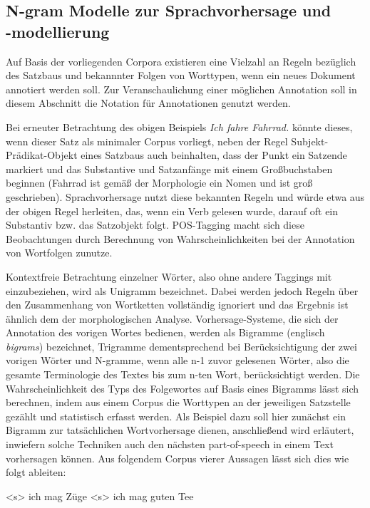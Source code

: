 \documentclass[12pt]{report}
\begin{document}
\subsection{N-gram Modelle zur Sprachvorhersage und\\ -modellierung}
Auf Basis der vorliegenden Corpora existieren eine Vielzahl an Regeln bezüglich des Satzbaus und bekannnter Folgen von Worttypen, wenn ein neues Dokument annotiert werden soll. Zur Veranschaulichung einer möglichen Annotation soll in diesem Abschnitt die Notation \cite{clw7} für Annotationen genutzt werden.

Bei erneuter Betrachtung des obigen Beispiels \textit{\glqq  Ich fahre Fahrrad.\grqq{}} könnte dieses, wenn dieser Satz als minimaler Corpus vorliegt, neben der Regel Subjekt-Prädikat-Objekt eines Satzbaus auch beinhalten, dass der Punkt ein Satzende markiert und das Substantive und Satzanfänge mit einem Großbuchstaben beginnen (\glqq  Fahrrad\grqq{} ist gemäß der Morphologie ein Nomen und ist groß geschrieben). Sprachvorhersage nutzt diese bekannten Regeln und würde etwa aus der obigen Regel herleiten, das, wenn ein Verb gelesen wurde, darauf oft ein Substantiv bzw. das Satzobjekt folgt. POS-Tagging macht sich diese Beobachtungen durch Berechnung von Wahrscheinlichkeiten bei der Annotation von Wortfolgen zunutze. 

Kontextfreie Betrachtung einzelner Wörter, also ohne andere Taggings mit einzubeziehen, wird als Unigramm bezeichnet. Dabei werden jedoch Regeln über den Zusammenhang von Wortketten vollständig ignoriert und das Ergebnis ist ähnlich dem der morphologischen Analyse. Vorhersage-Systeme, die sich der Annotation des vorigen Wortes bedienen, werden als Bigramme (englisch \textit{bigrams}) bezeichnet, Trigramme dementsprechend bei Berücksichtigung der zwei vorigen Wörter und N-gramme, wenn alle n-1 zuvor gelesenen Wörter, also die gesamte Terminologie des Textes bis zum n-ten Wort, berücksichtigt werden.
Die Wahrscheinlichkeit des Typs des Folgewortes auf Basis eines Bigramms lässt sich berechnen, indem aus einem Corpus die Worttypen an der jeweiligen Satzstelle gezählt und statistisch erfasst werden. 
Als Beispiel dazu soll hier zunächst ein Bigramm zur tatsächlichen Wortvorhersage dienen, anschließend wird erläutert, inwiefern solche Techniken auch den nächsten part-of-speech in einem Text vorhersagen können. Aus folgendem Corpus vierer Aussagen lässt sich dies wie folgt ableiten:
\\ \tt

<s> ich mag Züge <s> ich mag guten Tee 
\end{document}
